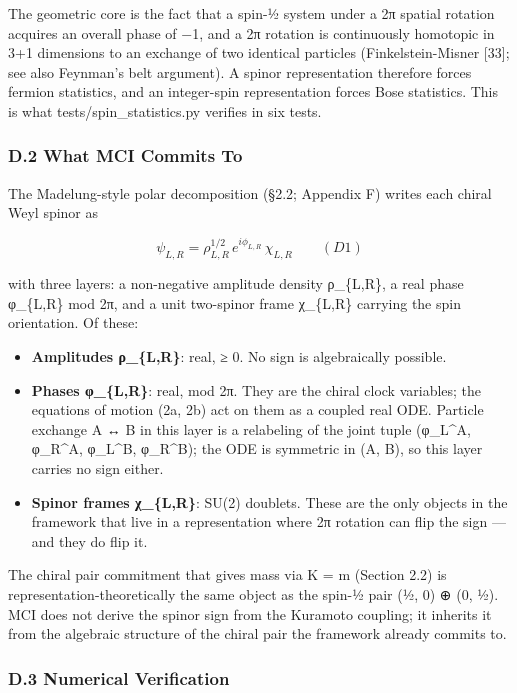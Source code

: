 \documentclass[
]{article}
\providecommand{\tightlist}{%
  \setlength{\itemsep}{0pt}\setlength{\parskip}{0pt}}
\begin{document}
The geometric core is the fact that a spin-½ system under a 2π spatial
rotation acquires an overall phase of −1, and a 2π rotation is
continuously homotopic in 3+1 dimensions to an exchange of two identical
particles (Finkelstein-Misner {[}33{]}; see also Feynman's belt
argument). A spinor representation therefore forces fermion statistics,
and an integer-spin representation forces Bose statistics. This is what
tests/spin\_statistics.py verifies in six tests.

\subsubsection{D.2 What MCI Commits To}\label{d.2-what-mci-commits-to}

The Madelung-style polar decomposition (§2.2; Appendix F) writes each
chiral Weyl spinor as

\[\psi_{L,R} = \rho_{L,R}^{1/2}\, e^{i\phi_{L,R}}\, \chi_{L,R} \qquad (D1)\]

with three layers: a non-negative amplitude density ρ\_\{L,R\}, a real
phase φ\_\{L,R\} mod 2π, and a unit two-spinor frame χ\_\{L,R\} carrying
the spin orientation. Of these:

\begin{itemize}
\tightlist
\item
  \textbf{Amplitudes ρ\_\{L,R\}}: real, ≥ 0. No sign is algebraically
  possible.
\item
  \textbf{Phases φ\_\{L,R\}}: real, mod 2π. They are the chiral clock
  variables; the equations of motion (2a, 2b) act on them as a coupled
  real ODE. Particle exchange A ↔ B in this layer is a relabeling of the
  joint tuple (φ\_L\^{}A, φ\_R\^{}A, φ\_L\^{}B, φ\_R\^{}B); the ODE is
  symmetric in (A, B), so this layer carries no sign either.
\item
  \textbf{Spinor frames χ\_\{L,R\}}: SU(2) doublets. These are the only
  objects in the framework that live in a representation where 2π
  rotation can flip the sign --- and they do flip it.
\end{itemize}

The chiral pair commitment that gives mass via K = m (Section 2.2) is
representation-theoretically the same object as the spin-½ pair (½, 0) ⊕
(0, ½). MCI does not derive the spinor sign from the Kuramoto coupling;
it inherits it from the algebraic structure of the chiral pair the
framework already commits to.

\subsubsection{D.3 Numerical
Verification}\label{d.3-numerical-verification}
\end{document}
